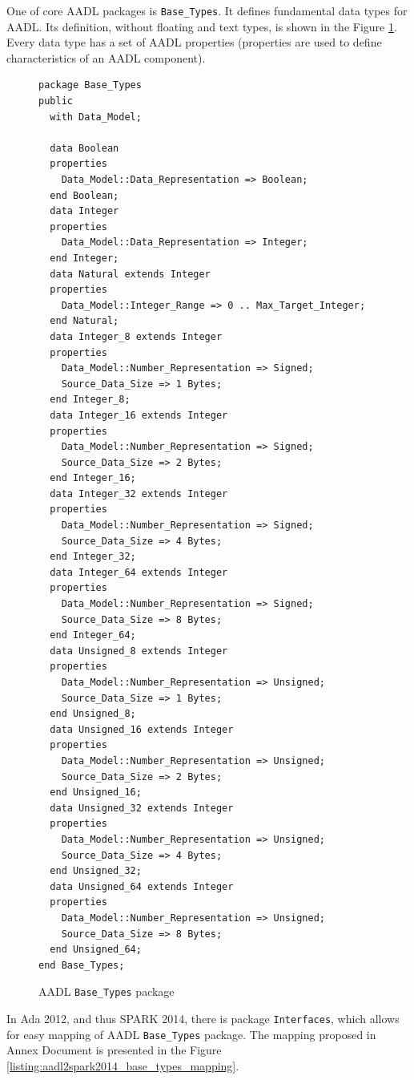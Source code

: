 One of core AADL packages is \lstinline{Base_Types}. It defines fundamental data types for AADL. Its definition, without floating and text types, is shown in the Figure \ref{listing:aadl_base_types}. Every data type has a set of AADL properties (properties are used to define characteristics of an AADL component).

\begin{figure}%
\singlespacing
\begin{lstlisting}[language=aadl, frame=single, gobble=0]
package Base_Types
public
  with Data_Model;

  data Boolean
  properties 
    Data_Model::Data_Representation => Boolean;
  end Boolean;
  data Integer
  properties
    Data_Model::Data_Representation => Integer;
  end Integer;
  data Natural extends Integer
  properties 
    Data_Model::Integer_Range => 0 .. Max_Target_Integer;
  end Natural;
  data Integer_8 extends Integer
  properties
    Data_Model::Number_Representation => Signed;
    Source_Data_Size => 1 Bytes;
  end Integer_8;
  data Integer_16 extends Integer
  properties
    Data_Model::Number_Representation => Signed;
    Source_Data_Size => 2 Bytes;
  end Integer_16;
  data Integer_32 extends Integer
  properties
    Data_Model::Number_Representation => Signed;
    Source_Data_Size => 4 Bytes;
  end Integer_32;
  data Integer_64 extends Integer
  properties
    Data_Model::Number_Representation => Signed;
    Source_Data_Size => 8 Bytes;
  end Integer_64;
  data Unsigned_8 extends Integer
  properties
    Data_Model::Number_Representation => Unsigned;
    Source_Data_Size => 1 Bytes;
  end Unsigned_8;
  data Unsigned_16 extends Integer
  properties
    Data_Model::Number_Representation => Unsigned;
    Source_Data_Size => 2 Bytes;
  end Unsigned_16;
  data Unsigned_32 extends Integer
  properties
    Data_Model::Number_Representation => Unsigned;
    Source_Data_Size => 4 Bytes;
  end Unsigned_32;
  data Unsigned_64 extends Integer
  properties
    Data_Model::Number_Representation => Unsigned;
    Source_Data_Size => 8 Bytes;
  end Unsigned_64;  
end Base_Types;
\end{lstlisting} 
\doublespacing
\caption{AADL \lstinline{Base_Types} package}
\label{listing:aadl_base_types}
\end{figure}

In Ada 2012, and thus SPARK 2014, there is package \lstinline{Interfaces}, which allows for easy mapping of AADL \lstinline{Base_Types} package. The mapping proposed in Annex Document \cite{AnnexDoc} is presented in the Figure \ref{listing:aadl2spark2014_base_types_mapping}.

